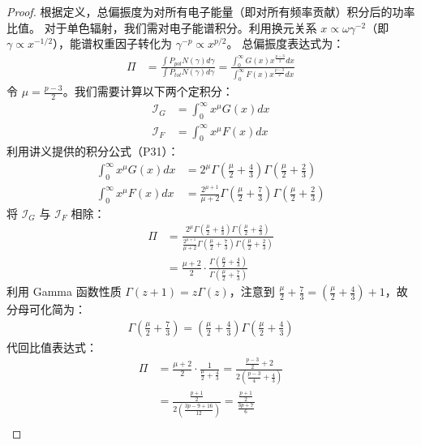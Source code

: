 \begin{proof}
根据定义，总偏振度为对所有电子能量（即对所有频率贡献）积分后的功率比值。
对于单色辐射，我们需对电子能谱积分。利用换元关系 $x \propto \omega \gamma^{-2}$（即 $\gamma \propto x^{-1/2}$），能谱权重因子转化为 $\gamma^{-p} \propto x^{p/2}$。
总偏振度表达式为：
\begin{align}
    \Pi &= \frac{\int P_{pol} N(\gamma) d\gamma}{\int P_{tot} N(\gamma) d\gamma} 
         = \frac{\int_0^\infty G(x) x^{\frac{p-3}{2}} dx}{\int_0^\infty F(x) x^{\frac{p-3}{2}} dx}
\end{align}
令 $\mu = \frac{p-3}{2}$。我们需要计算以下两个定积分：
\begin{align}
    \mathcal{I}_G &= \int_0^\infty x^\mu G(x) dx \\
    \mathcal{I}_F &= \int_0^\infty x^\mu F(x) dx
\end{align}
利用讲义提供的积分公式（P31）：
\begin{align}
    \int_0^\infty x^\mu G(x) dx &= 2^\mu \Gamma\left(\frac{\mu}{2} + \frac{4}{3}\right) \Gamma\left(\frac{\mu}{2} + \frac{2}{3}\right) \\
    \int_0^\infty x^\mu F(x) dx &= \frac{2^{\mu+1}}{\mu+2} \Gamma\left(\frac{\mu}{2} + \frac{7}{3}\right) \Gamma\left(\frac{\mu}{2} + \frac{2}{3}\right)
\end{align}
将 $\mathcal{I}_G$ 与 $\mathcal{I}_F$ 相除：
\begin{align}
    \Pi &= \frac{2^\mu \Gamma(\frac{\mu}{2} + \frac{4}{3}) \Gamma(\frac{\mu}{2} + \frac{2}{3})} 
             {\frac{2^{\mu+1}}{\mu+2} \Gamma(\frac{\mu}{2} + \frac{7}{3}) \Gamma(\frac{\mu}{2} + \frac{2}{3})} \\
        &= \frac{\mu+2}{2} \cdot \frac{\Gamma(\frac{\mu}{2} + \frac{4}{3})}{\Gamma(\frac{\mu}{2} + \frac{7}{3})}
\end{align}
利用 Gamma 函数性质 $\Gamma(z+1) = z \Gamma(z)$，注意到 $\frac{\mu}{2} + \frac{7}{3} = (\frac{\mu}{2} + \frac{4}{3}) + 1$，故分母可化简为：
\begin{align}
    \Gamma\left(\frac{\mu}{2} + \frac{7}{3}\right) = \left(\frac{\mu}{2} + \frac{4}{3}\right) \Gamma\left(\frac{\mu}{2} + \frac{4}{3}\right)
\end{align}
代回比值表达式：
\begin{align}
    \Pi &= \frac{\mu+2}{2} \cdot \frac{1}{\frac{\mu}{2} + \frac{4}{3}} 
         = \frac{\frac{p-3}{2} + 2}{2 (\frac{p-3}{4} + \frac{4}{3})} \\
        &= \frac{\frac{p+1}{2}}{2 (\frac{3p-9+16}{12})} 
         = \frac{\frac{p+1}{2}}{\frac{3p+7}{6}} \\

\end{align}
\end{proof}
